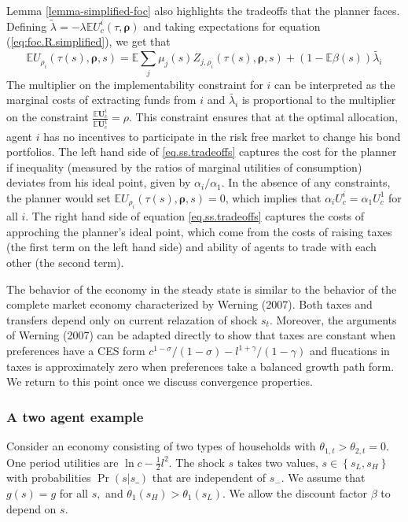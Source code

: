 \documentclass[thmsb,11pt]{article}
\begin{document}
Lemma \ref{lemma-simplified-foc} also highlights the tradeoffs that the planner faces.  Defining $\tilde{\lambda}=-\lambda \mathbb{E} U^i_c(\tau,\bm \rho)$ and taking expectations for equation (\ref{eq:foc.R.simplified}), we get that
\begin{equation}
\label{eq.ss.tradeoffs}
\mathbb{E} U_{\rho_i}(\tau(s),\bm \rho,s)= \mathbb{E} \sum_j\mu_j(s)Z_{j,\rho_i}(\tau(s),\bm \rho,s) + (1-\mathbb{E}\beta(s))\tilde{\lambda_i} 
\end{equation}
The multiplier on the implementability constraint for $i$ can be interpreted as the marginal costs of extracting funds from $i$  and $\tilde{\lambda_i}$ is proportional to the multiplier on the constraint $\frac{\mathbb{E}\bm{U}^i_c}{\mathbb{E}\bm{U}^1_c}=\rho$. This constraint ensures that at the optimal allocation, agent $i$ has no  incentives to participate in the risk free market to change his bond portfolios. The left hand side of \eqref{eq.ss.tradeoffs} captures the cost for the planner if inequality (measured by the ratios of marginal utilities of consumption) deviates from his ideal point, given by $\alpha_i/\alpha_1$. In the absence of any constraints, the planner would set $\mathbb{E} U_{\rho_i}(\tau(s),\bm \rho,s)=0$, which implies that $\alpha_i U^i_c = \alpha_1 U^1_c$ for all $i$. The right hand side of equation \eqref{eq.ss.tradeoffs} captures the costs of approching the planner's ideal point, which come from the costs of raising taxes (the first term on the left hand side) and ability of 
agents to trade with each other (the second term).

The behavior of the economy in the steady state is similar to the behavior of the complete market economy characterized by Werning (2007). Both taxes and transfers depend only on current relazation of shock $s_t$. Moreover, the arguments of Werning (2007) can be adapted directly to show that taxes are constant when preferences have a CES form $c^{1-\sigma}/(1-\sigma) - l^{1+\gamma}/(1-\gamma) $ and flucations in taxes is approximately zero when preferences take a balanced growth path form. We return to this point once we discuss convergence properties. 

\subsubsection{A two agent example}\label{sec: 2 agent example}

\smallskip Consider an economy consisting of  two types of households with $%
\theta _{1,t}>\theta _{2,t}=0$. One period utilities are $\ln c-\frac{1}{2}%
l^{2}.$ The shock $s$  takes  two values, $s\in \left\{
s_{L},s_{H}\right\} $ with probabilities $\Pr \left( s|s\_\right) $ that are
independent of $s_{-}.$ We assume that $g\left( s\right) =g$ for all $s,$
and $\theta _{1}\left( s_{H}\right) >\theta _{1}\left( s_{L}\right) .$ We allow the discount factor $\beta $ to depend on  $s.$
\end{document}
